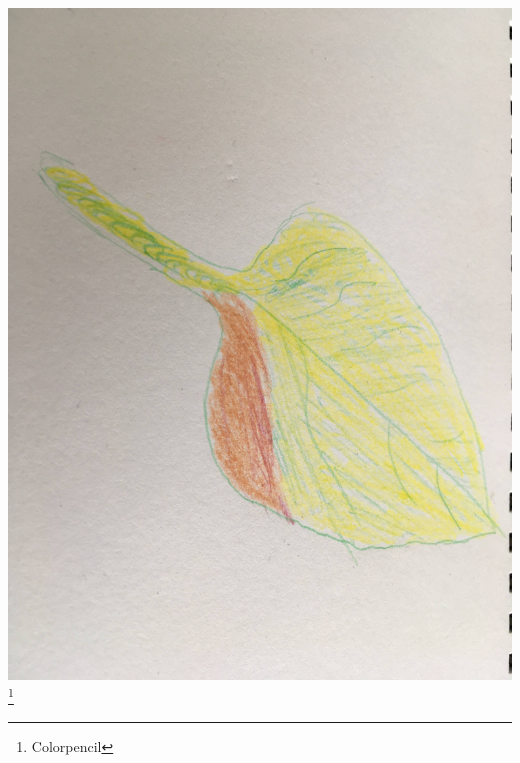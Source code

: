 \documentclass[12pt, letter]{article}
\begin{document}
\includegraphics[width=\textwidth,height=\textheight,keepaspectratio]{leaf-colorpencil.jpg}
\footnote*{Colorpencil}
\newpage
\end{document}

